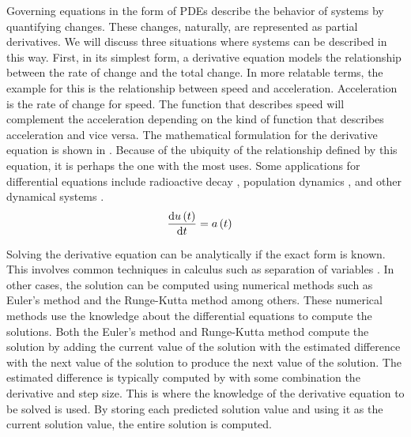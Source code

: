 Governing equations in the form of PDEs describe the behavior of systems by quantifying changes. These changes, naturally, are represented as partial derivatives. We will discuss three situations where systems can be described in this way. First, in its simplest form, a derivative equation models the relationship between the rate of change and the total change. In more relatable terms, the example for this is the relationship between speed and acceleration. Acceleration is the rate of change for speed. The function that describes speed will complement the acceleration depending on the kind of function that describes acceleration and vice versa. The mathematical formulation for the derivative equation is shown in . Because of the ubiquity of the relationship defined by this equation, it is perhaps the one with the most uses. Some applications for differential equations include radioactive decay \autocite{grochRadioactiveDecay1998,huestisUnderstandingOriginMeaning2002}, population dynamics \autocite{gopalsamyStabilityOscillationsDelay1992}, and other dynamical systems \autocite{katokIntroductionModernTheory2009}.
\begin{align}
  \dv{u\left( t \right)}{t} & = a\left( t \right) \label{eq:derivative}
\end{align}

Solving the derivative equation can be analytically if the exact form is known. This involves common techniques in calculus such as separation of variables \autocite{braunDifferentialEquationsTheir1993}. In other cases, the solution can be computed using numerical methods such as Euler's method and the Runge-Kutta method among others. These numerical methods use the knowledge about the differential equations to compute the solutions. Both the Euler's method and Runge-Kutta method compute the solution by adding the current value of the solution with the estimated difference with the next value of the solution to produce the next value of the solution. The estimated difference is typically computed by with some combination the derivative and step size. This is where the knowledge of the derivative equation to be solved is used. By storing each predicted solution value and using it as the current solution value, the entire solution is computed.

